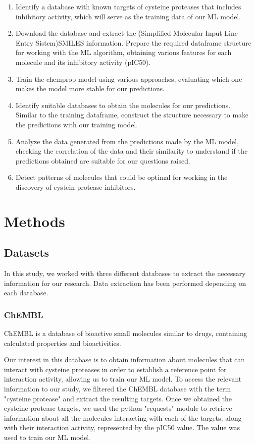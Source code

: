 \documentclass[final,times,twocolumn,article]{elsarticle}
\begin{document}
\begin{enumerate}
    \item Identify a database with known targets of cysteine proteases that includes inhibitory activity, which will serve as the training data of our ML model. 
    \item Download the database and extract the (Simplified Molecular Input Line Entry Sistem)SMILES information. Prepare the required dataframe structure for working with the ML algorithm, obtaining various features for each molecule and its inhibitory activity (pIC50).
    \item Train the chemprop model using various approaches, evaluating which one makes the model more stable for our predictions. 
    \item Identify suitable databases to obtain the molecules for our predictions. Similar to the training dataframe, construct the structure necessary to make the predictions with our training model. 
    \item Analyze the data generated from the predictions made by the ML model, checking the correlation of the data and their similarity to understand if the predictions obtained are suitable for our questions raised. 
    \item Detect patterns of molecules that could be optimal for working in the discovery of cystein protease inhibitors. 
\end{enumerate}

\section{Methods}

\subsection{Datasets}

In this study, we worked with three different databases to extract the necessary information for our research. Data extraction has been performed depending on each database.  

\subsubsection{ChEMBL}

ChEMBL is a database of bioactive small molecules similar to drugs, containing calculated properties and bioactivities. \cite{chemblweb}

Our interest in this database is to obtain information about molecules that can interact with cysteine proteases in order to establish a reference point for interaction activity, allowing us to train our ML model. To access the relevant information to our study, we filtered the ChEMBL database with the term "cysteine protease" and extract the resulting targets. Once we obtained the cysteine protease targets, we used the python "requests" module to retrieve information about all the molecules interacting with each of the targets, along with their interaction activity, represented by the pIC50 value. The value was used to train our ML model. 
\end{document}
